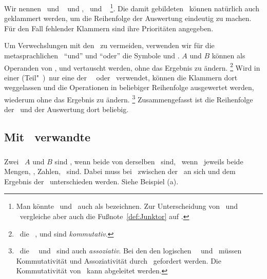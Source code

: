 Wir nennen \MtsAnd\ und \MtsOr\  und \MtsImp, \MtsRep\ und \MtsEquiv\ %
\footnote{%
	Man könnte \Metaoperationen\ und \Metarelationen\ auch als  bezeichnen. Zur Unterscheidung von \Operationen\ und \Relationen\ vergleiche aber auch die Fußnote~\ref{def:Junktor} auf .
}.
Die damit gebildeten \Aussagen\ können natürlich auch geklammert werden, um die Reihenfolge der Auswertung eindeutig zu machen.
Für den Fall fehlender Klammern sind ihre Prioritäten  angegeben.

Um Verwechslungen mit den \Junktoren\ zu vermeiden, verwenden wir für die metasprachlichen \Operationen\ "`und"' und "`oder"' die Symbole \chrqt{\MtsAnd} und \chrqt{\MtsOr}.
$A$ und $B$ können als Operanden von \chrqt{\MtsEquiv}, \chrqt{\MtsAnd} und \chrqt{\MtsOr} vertauscht werden, ohne das Ergebnis zu ändern.%
\footnote{%
	\textDh\ die \Operationen\ \chrqt{\MtsEquiv}, \chrqt{\MtsAnd} und \chrqt{\MtsOr} sind \emph{kommutativ}.
}
Wird in einer (Teil"~)\Aussage\ nur eine der \Operationen\ \MtsAnd\ oder \MtsOr\ verwendet, können die Klammern dort weggelassen und die Operationen in beliebiger Reihenfolge ausgewertet werden, wiederum ohne das Ergebnis zu ändern.%
\footnote{%
	\textDh\ die \Operationen\ \MtsAnd\ und \MtsOr\ sind auch \emph{assoziativ}.
	Bei den den logischen \Operationen\ \OjkAnd\ und \OjkOr\ müssen Kommutativität und Assoziativität durch \Axiome\ gefordert werden.
	Die Kommutativität von \MtsEquiv\ kann abgeleitet werden.
}
Zusammengefasst ist die Reihenfolge der \Operationen\ und der Auswertung dort beliebig.

\subsection[Mit Gleichheit verwandte Relationen]{Mit \Gleichheit\ verwandte \Relationen}
\label     {sub:Gleichheit}

\subsubsection[Vergleichbar]{\Vergleichbar}%
\label {subsub:Vergleichbar}

Zwei \Objekte\ $A$ und $B$ sind , wenn beide von derselben \Objektart\ sind, \textdh\ wenn \textzB\ jeweils beide Mengen, \Symbolfolgen, Zahlen, \textusw\ sind.
Dabei muss bei \Formeln\ zwischen der \Formel\ an sich und dem Ergebnis der \Formel\ unterschieden werden. Siehe Beispiel (a).


